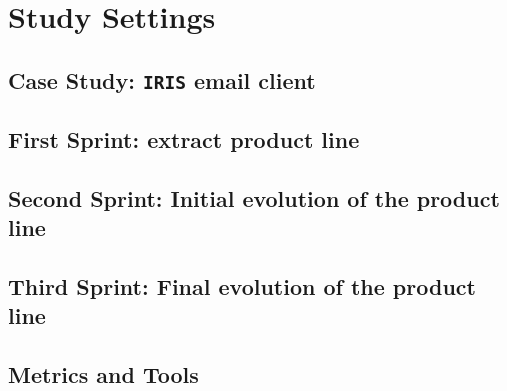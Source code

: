 \section{Study Settings}


% 

\subsection{Case Study: \texttt{IRIS} email client}

%
%



\subsection{First Sprint: extract product line}

\subsection{Second Sprint: Initial evolution of the product line}


\subsection{Third Sprint: Final evolution of the product line}




\subsection{Metrics and Tools}


